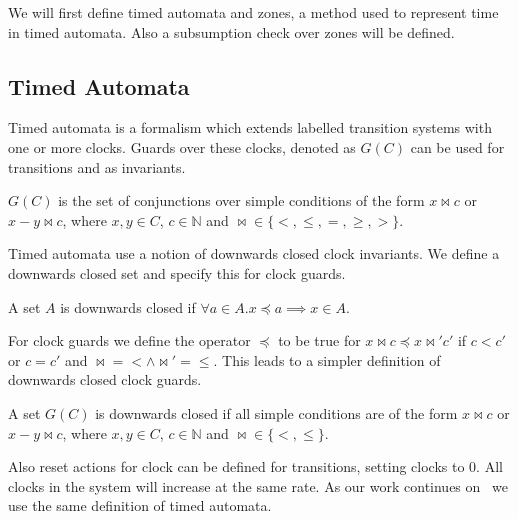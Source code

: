 We will first define timed automata and zones, a method used to represent time in timed automata. Also a subsumption check over zones will be defined. 

\subsection{Timed Automata}
Timed automata is a formalism which extends labelled transition systems with one or more clocks. Guards over these clocks, denoted as $G(C)$ can be used for transitions and as invariants. 

\begin{mydef}
\label{def:clockGuards}
$G(C)$ is the set of conjunctions over simple conditions of the form $x \Join c$ or $x-y \Join c$, where $x,y \in C$, $c \in \mathbb{N}$ and $\Join \in \{<,\leq,=,\geq,>\}$.
\end{mydef}

Timed automata use a notion of downwards closed clock invariants. We define a downwards closed set and specify this for clock guards.

\begin{mydef}
A set $A$ is downwards closed if $\forall a \in A. x \preceq a \implies x \in A$. 
\end{mydef}

For clock guards we define the operator $\preceq$ to be true for $x \Join c \preceq x \Join' c'$ if $c < c'$ or $c = c'$ and $\Join = < \wedge \Join' = \leq$. This leads to a simpler definition of downwards closed clock guards.

\begin{mydef}
A set $G(C)$ is downwards closed if all simple conditions are of the form $x \Join c$ or $x-y \Join c$, where $x,y \in C$, $c \in \mathbb{N}$ and $\Join \in \{<,\leq\}$.
\end{mydef}


Also reset actions for clock can be defined for transitions, setting clocks to $0$. All clocks in the system will increase at the same rate. As our work continues on~\cite{eemcs21972} we use the same definition of timed automata.

